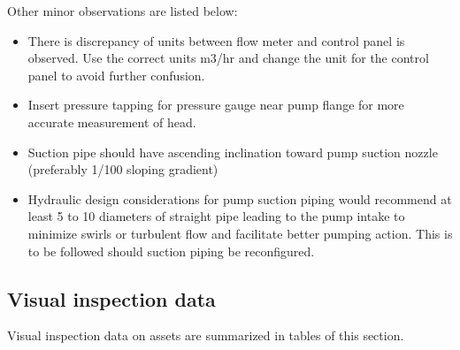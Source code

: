 Other minor observations are listed below:

\begin {itemize}
	\item There is discrepancy of units between flow meter and control panel is observed. Use the correct units m3/hr and change the unit for the control panel to avoid further confusion.
	\item Insert pressure tapping for pressure gauge near pump flange for more accurate measurement of head.
	\item Suction pipe should have ascending inclination toward pump suction nozzle (preferably 1/100 sloping gradient)
	\item Hydraulic design considerations for pump suction piping would recommend at least 5 to 10 diameters of straight pipe leading to the pump intake to minimize swirls or turbulent flow and facilitate better pumping action. This is to be followed should suction piping be reconfigured.
\end{itemize}













\subsection{Visual inspection data}
Visual inspection data on assets are summarized in tables of this section. %

